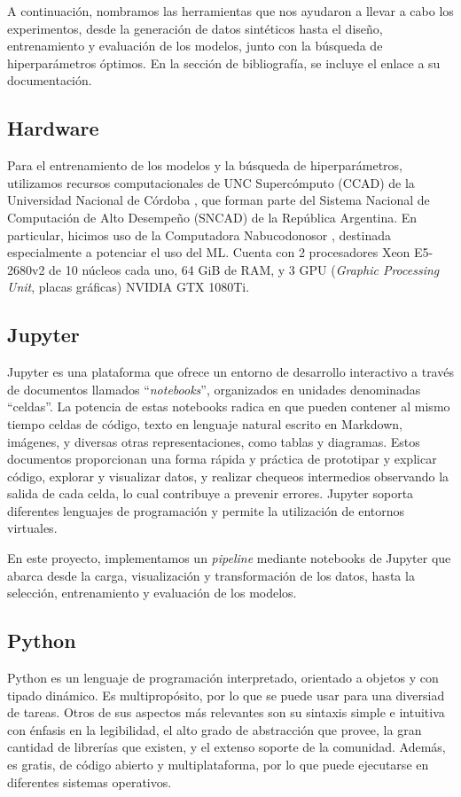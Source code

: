 \documentclass[../../main.tex]{subfiles}
\begin{document}
A continuación, nombramos las herramientas que nos ayudaron a llevar a cabo los
experimentos, desde la generación de datos sintéticos hasta el diseño, entrenamiento y
evaluación de los modelos, junto con la búsqueda de hiperparámetros óptimos. En la
sección de bibliografía, se incluye el enlace a su documentación.

\subsection{Hardware}
Para el entrenamiento de los modelos y la búsqueda de hiperparámetros, utilizamos recursos
computacionales de UNC Supercómputo (CCAD) de la Universidad Nacional de Córdoba
\cite{ccad}, que forman parte del Sistema Nacional de Computación de Alto Desempeño
(SNCAD) de la República Argentina. En particular, hicimos uso de la Computadora
Nabucodonosor \cite{nabu}, destinada especialmente a potenciar el uso del ML. Cuenta con 2
procesadores Xeon E5-2680v2 de 10 núcleos cada uno, 64 GiB de RAM, y 3 GPU
(\textit{Graphic Processing Unit}, placas gráficas) NVIDIA GTX 1080Ti.

\subsection{Jupyter}
Jupyter \cite{jupyter-docs} es una plataforma que ofrece un entorno de desarrollo
interactivo a través de documentos llamados ``\textit{notebooks}'', organizados en
unidades denominadas ``celdas''. La potencia de estas notebooks radica en que pueden
contener al mismo tiempo celdas de código, texto en lenguaje natural escrito en Markdown,
imágenes, y diversas otras representaciones, como tablas y diagramas. Estos documentos
proporcionan una forma rápida y práctica de prototipar y explicar código, explorar y
visualizar datos, y realizar chequeos intermedios observando la salida de cada celda, lo
cual contribuye a prevenir errores. Jupyter soporta diferentes lenguajes de programación y
permite la utilización de entornos virtuales.

En este proyecto, implementamos un \textit{pipeline} mediante notebooks de Jupyter que
abarca desde la carga, visualización y transformación de los datos, hasta la selección,
entrenamiento y evaluación de los modelos.

\subsection{Python}
Python \cite{python-docs} es un lenguaje de programación interpretado, orientado a objetos
y con tipado dinámico. Es multipropósito, por lo que se puede usar para una diversiad de
tareas. Otros de sus aspectos más relevantes son su sintaxis simple e intuitiva con
énfasis en la legibilidad, el alto grado de abstracción que provee, la gran cantidad de
librerías que existen, y el extenso soporte de la comunidad. Además, es gratis, de código
abierto y multiplataforma, por lo que puede ejecutarse en diferentes sistemas operativos.
\end{document}
